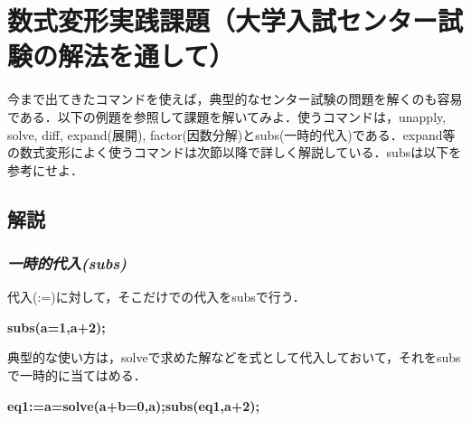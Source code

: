 \documentclass{article}
\begin{document}
\pagestyle{empty}
\section{\textbf{数式変形実践課題（大学入試センター試験の解法を通して）}}
\begin{maplelatex}\begin{Maple Normal}{
今まで出てきたコマンドを使えば，典型的なセンター試験の問題を解くのも容易である．以下の例題を参照して課題を解いてみよ．使うコマンドは，unapply, solve, diff, expand(展開), factor(因数分解)とsubs(一時的代入)である．expand等の数式変形によく使うコマンドは次節以降で詳しく解説している．subsは以下を参考にせよ．}\end{Maple Normal}
\end{maplelatex}
\subsection{\textbf{解説}}
\subsubsection{\textbf{\textit{一時的代入(subs)}}}
\begin{maplegroup}
\begin{Maple Normal}{
代入(:=)に対して，そこだけでの代入をsubsで行う．}\end{Maple Normal}

\textbf{subs(a=1,a+2);}\mapleresult
\begin{maplelatex}
\end{maplelatex}
\end{maplegroup}
\begin{maplegroup}
\begin{Maple Normal}{
典型的な使い方は，solveで求めた解などを式として代入しておいて，それをsubsで一時的に当てはめる．}\end{Maple Normal}

\textbf{eq1:=a=solve(a+b=0,a);}\textbf{subs(eq1,a+2);}\mapleresult
\begin{maplelatex}
\end{maplelatex}
\mapleresult
\begin{maplelatex}
\end{maplelatex}
\end{maplegroup}
\end{document}
